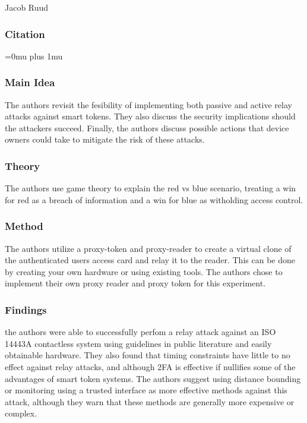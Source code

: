 \noindent
Jacob Ruud

\noindent
\subsubsection{Citation}

\Urlmuskip=0mu plus 1mu\relax

\subsubsection{Main Idea}

\noindent
The authors revisit the fesibility of implementing both passive and active relay attacks against smart tokens. They also discuss the security implications should the attackers succeed. Finally, the authors discuss possible actions that device owners could take to mitigate the risk of these attacks.

\subsubsection{Theory}

\noindent
The authors use game theory to explain the red vs blue scenario, treating a win for red as a breach of information and a win for blue as witholding access control.

\subsubsection{Method}

\noindent
The authors utilize a proxy-token and proxy-reader to create a virtual clone of the authenticated users access card and relay it to the reader. This can be done by creating your own hardware or using existing tools. The authors chose to implement their own proxy reader and proxy token for this experiment.

\subsubsection{Findings}

\noindent
the authors were able to successfully perfom a relay attack against an ISO 14443A contactless system using guidelines in public literature and easily obtainable hardware. They also found that timing constraints have little to no effect against relay attacks, and although 2FA is effective if nullifies some of the advantages of smart token systems. The authors suggest using distance bounding or monitoring using a trusted interface as more effective methods against this attack, although they warn that these methods are generally more expensive or complex. 

